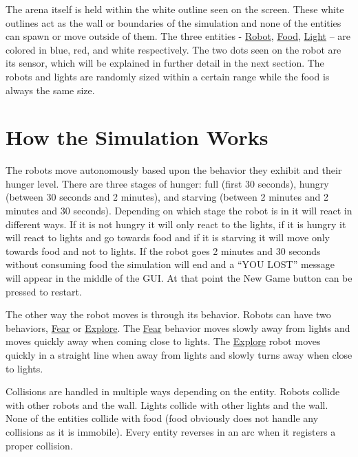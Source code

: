 The arena itself is held within the white outline seen on the screen. These white outlines act as the wall or boundaries of the simulation and none of the entities can spawn or move outside of them. The three entities -\/ \mbox{\hyperlink{class_robot}{Robot}}, \mbox{\hyperlink{class_food}{Food}}, \mbox{\hyperlink{class_light}{Light}} – are colored in blue, red, and white respectively. The two dots seen on the robot are its sensor, which will be explained in further detail in the next section. The robots and lights are randomly sized within a certain range while the food is always the same size.\hypertarget{index_how_it_works_sec}{}\section{How the Simulation Works}\label{index_how_it_works_sec}
The robots move autonomously based upon the behavior they exhibit and their hunger level. There are three stages of hunger\+: full (first 30 seconds), hungry (between 30 seconds and 2 minutes), and starving (between 2 minutes and 2 minutes and 30 seconds). Depending on which stage the robot is in it will react in different ways. If it is not hungry it will only react to the lights, if it is hungry it will react to lights and go towards food and if it is starving it will move only towards food and not to lights. If the robot goes 2 minutes and 30 seconds without consuming food the simulation will end and a “\+Y\+OU L\+O\+S\+T” message will appear in the middle of the G\+UI. At that point the New Game button can be pressed to restart.

The other way the robot moves is through its behavior. Robots can have two behaviors, \mbox{\hyperlink{class_fear}{Fear}} or \mbox{\hyperlink{class_explore}{Explore}}. The \mbox{\hyperlink{class_fear}{Fear}} behavior moves slowly away from lights and moves quickly away when coming close to lights. The \mbox{\hyperlink{class_explore}{Explore}} robot moves quickly in a straight line when away from lights and slowly turns away when close to lights.

Collisions are handled in multiple ways depending on the entity. Robots collide with other robots and the wall. Lights collide with other lights and the wall. None of the entities collide with food (food obviously does not handle any collisions as it is immobile). Every entity reverses in an arc when it registers a proper collision. 